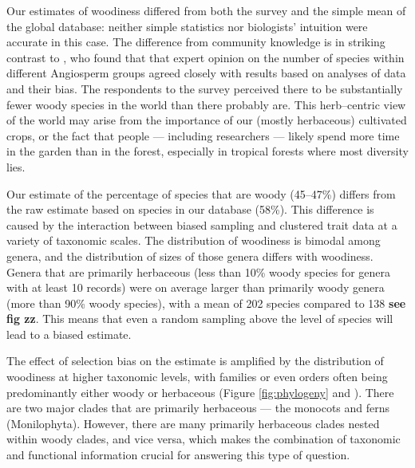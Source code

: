 \documentclass[a4paper,12pt]{article}
\begin{document}
Our estimates of woodiness differed from both the survey and the
simple mean of the global database: neither simple statistics nor
biologists' intuition were accurate in this case.  The difference from
community knowledge is in striking contrast to \citet{joppa2010}, who
found that that expert opinion on the number of species within
different Angiosperm groups agreed closely with results based on
analyses of data and their bias.
The respondents to the survey perceived there to be substantially fewer woody
species in the world than there probably are.  This herb--centric view
of the world may arise from the importance of our (mostly herbaceous)
cultivated crops, or the fact that people --- including researchers
--- likely spend more time in the garden than in the forest, especially in tropical forests where most diversity lies.

%
Our estimate of the percentage of species that are woody (45--47\%)
differs from the raw estimate based on species in our database (58\%).
This difference is caused by the interaction between biased sampling
and clustered trait data at a variety of taxonomic scales.
%
The distribution of woodiness is bimodal among genera, and the
distribution of sizes of those genera differs with woodiness.  Genera
that are primarily herbaceous (less than 10\% woody species for genera
with at least 10 records) were on average larger than primarily woody
genera (more than 90\% woody species), with a mean of 202 species
compared to 138 \textbf{see fig zz}. 
This means that even a random sampling above the
level of species will lead to a biased estimate.

The effect of selection bias on the estimate is amplified by the distribution of woodiness at higher
taxonomic levels, with families or even orders often being
predominantly either woody or herbaceous (Figure \ref{fig:phylogeny} and
\citealt{sinnott1915evolution}).  There are two major clades that are
primarily herbaceous --- the monocots and ferns
(Monilophyta). However, there are many primarily herbaceous clades
nested within woody clades, and vice versa, which makes the
combination of taxonomic and functional information crucial for
answering this type of question.  
\end{document}
